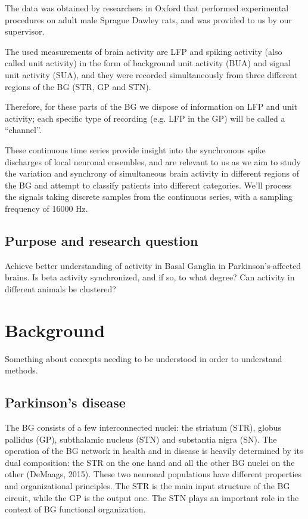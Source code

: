 \documentclass{article}
\begin{document}
The data was obtained by researchers in Oxford that performed experimental procedures on adult male Sprague Dawley rats, and was provided to us by our supervisor.

The used measurements of brain activity are LFP and spiking activity (also called unit activity) in the form of background unit activity (BUA) and signal unit activity (SUA), and they were recorded simultaneously from three different regions of the BG (STR, GP and STN).

Therefore, for these parts of the BG we dispose of information on LFP and unit activity; each specific type of recording (e.g. LFP in the GP) will be called a “channel”.

These continuous time series provide insight into the synchronous spike discharges of local neuronal ensembles, and are relevant to us as we aim to study the variation and synchrony of simultaneous brain activity in different regions of the BG and attempt to classify patients into different categories. We’ll process the signals taking discrete samples from the continuous series, with a sampling frequency of 16000 Hz.


\subsection{Purpose and research question}
Achieve better understanding of activity in Basal Ganglia in Parkinson's-affected brains.
Is beta activity synchronized, and if so, to what degree?
Can activity in different animals be clustered?

\newpage
\section{Background}
Something about concepts needing to be understood in order to understand methods.

\subsection{Parkinson's disease}
The BG consists of a few interconnected nuclei: the striatum (STR), globus pallidus (GP), subthalamic nucleus (STN) and substantia nigra (SN). The operation of the BG network in health and in disease is heavily determined by its dual composition: the STR on the one hand and all the other BG nuclei on the other (DeMaags, 2015). These two neuronal populations have different properties and organizational principles.
The STR is the main input structure of the BG circuit, while the GP is the output one. The STN plays an important role in the context of BG functional organization.
\end{document}
